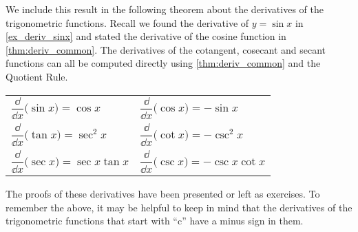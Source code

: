 We include this result in the following theorem about the derivatives of the trigonometric functions. Recall we found the derivative of $y=\sin x$ in \autoref{ex_deriv_sinx} and stated the derivative of the cosine function in \autoref{thm:deriv_common}. The derivatives of the cotangent, cosecant and secant functions can all be computed directly using \autoref{thm:deriv_common} and the Quotient Rule.

\begin{theorem}\label{thm:deriv_trig}
\begin{anywhereenum}
\renewcommand{\arraystretch}{2.2}
	\begin{tabular}{ll}
		\item	$\dfrac{\dd}{\dd x}\bigl(\sin x\bigr) = \cos x$ &
		\item	$\dfrac{\dd}{\dd x}\bigl(\cos x\bigr) = -\sin x$ \\
		\item	$\dfrac{\dd}{\dd x}\bigl(\tan x\bigr) = \sec^2 x$ \qquad\quad\null&
		\item	$\dfrac{\dd}{\dd x}\bigl(\cot x\bigr) = -\csc^2 x$ \\
		\item	$\dfrac{\dd}{\dd x}\bigl(\sec x\bigr) = \sec x\tan x$ &
		\item	$\dfrac{\dd}{\dd x}\bigl(\csc x\bigr) = -\csc x\cot x$
	\end{tabular}
\end{anywhereenum}
\end{theorem}

The proofs of these derivatives have been presented or left as exercises. To remember the above, it may be helpful to keep in mind that the derivatives of the trigonometric functions that start with ``c'' have a minus sign in them.


